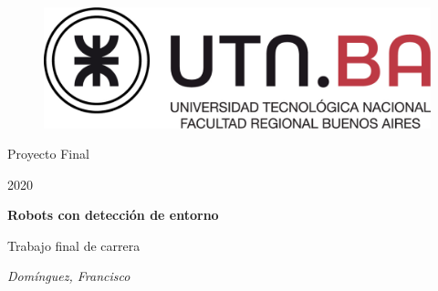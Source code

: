 \documentclass[a4paper,10pt]{article}
\numberwithin{equation}{section}
\begin{document}
\begin{titlepage}
\centering
\begin{figure}[t]
	\centering
	\includegraphics[scale=0.15]{utn.jpg}
    \vspace{0.5cm}
\end{figure}%
	{\LARGE Proyecto Final\par}
    {\LARGE 2020\par}
	\vspace{1cm}
	{\huge\bfseries Robots con detección de entorno\par}
	\vspace{1cm}
    {\LARGE Trabajo final de carrera\par}
    \vspace{1cm}
	{\Large\itshape Domínguez, Francisco\par}
	\vfill
\end{titlepage}


\tableofcontents

\newpage
\listoffigures
\newpage
\listoftables

\newpage


\newpage


\newpage


\newpage


\newpage


\newpage


\newpage


\newpage


\newpage


\newpage


\newpage


\newpage


\newpage


\newpage

\end{document}
